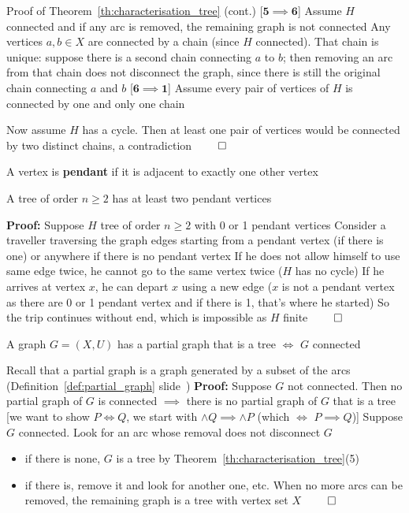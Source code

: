 \documentclass[aspectratio=43]{beamer}
\begin{document}
\begin{frame}{Proof of Theorem~\ref{th:characterisation_tree} (cont.)}
[$\mathbf{5\implies 6}$]
Assume $H$ connected and if any arc is removed, the remaining graph is not connected
\vskip0.5cm
Any vertices $a,b\in X$ are connected by a chain (since $H$ connected). That chain is unique: suppose there is a second chain connecting $a$ to $b$; then removing an arc from that chain does not disconnect the graph, since there is still the original chain connecting $a$ and $b$
\vfill
[$\mathbf{6\implies 1}$]
Assume every pair of vertices of $H$ is connected by one and only one chain

Now assume $H$ has a cycle. Then at least one pair of vertices would be connected by two distinct chains, a contradiction
\vfill
\flushright$\qed$
\end{frame}


\begin{frame}
\begin{definition}
A vertex is \textbf{pendant} if it is adjacent to exactly one other vertex
\end{definition}
\vfill
\begin{theorem}
A tree of order $n\geq 2$ has at least two pendant vertices
\end{theorem}
\vfill
\textbf{Proof:} 
Suppose $H$ tree of order $n\geq 2$ with 0 or 1 pendant vertices
\vskip0.5cm
Consider a traveller traversing the graph edges starting from a pendant vertex (if there is one) or anywhere if there is no pendant vertex
\vskip0.5cm
If he does not allow himself to use same edge twice, he cannot go to the same vertex twice ($H$ has no cycle)
\vskip0.5cm
If he arrives at vertex $x$, he can depart $x$ using a new edge ($x$ is not a pendant vertex as there are 0 or 1 pendant vertex and if there is 1, that's where he started)
\vskip0.5cm
So the trip continues without end, which is impossible as $H$ finite $\qed$
\end{frame}

\begin{frame}
\begin{theorem}\label{th:partial_graph_tree_G_connected}
A graph $G=(X,U)$ has a partial graph that is a tree $\iff$ $G$ connected
\end{theorem}
\vfill
Recall that a partial graph is a graph generated by a subset of the arcs (Definition~\ref{def:partial_graph} slide~\pageref{def:partial_graph})
\vfill
\textbf{Proof:}
Suppose $G$ not connected. Then no partial graph of $G$ is connected $\implies$ there is no partial graph of $G$ that is a tree [we want to show $P\iff Q$, we start with $\wedge Q\implies \wedge P$ (which $\iff$ $P\implies Q$)]
\vskip1cm
Suppose $G$ connected. Look for an arc whose removal does not disconnect $G$
\begin{itemize}
\item if there is none, $G$ is a tree by Theorem~\ref{th:characterisation_tree}(5)
\item if there is, remove it and look for another one, etc. When no more arcs can be removed, the remaining graph is a tree with vertex set $X$ $\qed$
\end{itemize}
\end{frame}
\end{document}
